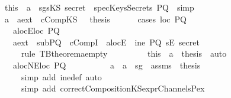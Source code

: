 \begin{isabellebody}
\ \ \ \ \ \isamarkupfalse \ this\ \ a{}\ \isamarkupfalse \ sg{}{\isacharcolon}{\isachardoublequoteopen}sKS\ secret\ {\isasymnotin}\ specKeysSecrets\ PQ{\isachardoublequoteclose}\ \isamarkupfalse \ simp\isanewline
\ \ \ \ \ \isamarkupfalse \ a{}\ \ a{}{}ext\ \ cCompKS\ \ \isamarkupfalse \ {\isacharquery}thesis\isanewline
\ \ \ \ \ \isamarkupfalse \ {\isacharparenleft}cases\ {\isachardoublequoteopen}loc\ PQ\ {\isacharequal}\ {\isacharbraceleft}{\isacharbraceright}{\isachardoublequoteclose}{\isacharparenright}\isanewline
\ \ \ \ \ \ \ \isamarkupfalse \ a{}{}locE{\isacharcolon}{\isachardoublequoteopen}loc\ PQ\ {\isacharequal}\ {\isacharbraceleft}{\isacharbraceright}{\isachardoublequoteclose}\isanewline
\ \ \ \ \ \ \ \isamarkupfalse \ a{}{}ext\ \ subPQ\ \ cCompI\ \ a{}{}locE\ \isamarkupfalse \ {\isachardoublequoteopen}ine\ PQ\ {\isacharparenleft}sE\ secret{\isacharparenright}{\isachardoublequoteclose}\ \isanewline
\ \ \ \ \ \ \ \ \ \isamarkupfalse \ {\isacharparenleft}rule\ TBtheorem{}a{\isacharunderscore}empty{\isacharparenright}\ \isanewline
\ \ \ \ \ \ \ \isamarkupfalse \ this\ \ a{}\ \isamarkupfalse \ {\isacharquery}thesis\ \isamarkupfalse \ auto\isanewline
\ \ \ \ \ \isamarkupfalse \ \isanewline
\ \ \ \ \ \ \ \isamarkupfalse \ a{}{}locNE{\isacharcolon}{\isachardoublequoteopen}loc\ PQ\ {\isasymnoteq}\ {\isacharbraceleft}{\isacharbraceright}{\isachardoublequoteclose}\isanewline
\ \ \ \ \ \ \ \isamarkupfalse \ a{}\ \ a{}{}\ \ sg{}\ \ assms\ \isamarkupfalse \ {\isacharquery}thesis\isanewline
\ \ \ \ \ \ \ \ \ \isamarkupfalse \ {\isacharparenleft}simp\ add{\isacharcolon}\ ine{\isacharunderscore}def{\isacharcomma}\ auto{\isacharparenright}\isanewline
\ \ \ \ \ \ \ \ \ \isamarkupfalse \ {\isacharparenleft}simp\ add{\isacharcolon}\ correctCompositionKS{\isacharunderscore}exprChannel{\isacharunderscore}s{\isacharunderscore}Pex{\isacharparenright}\ \isanewline
\ \ \ \ \ \isamarkupfalse \isanewline

\end{isabellebody}
